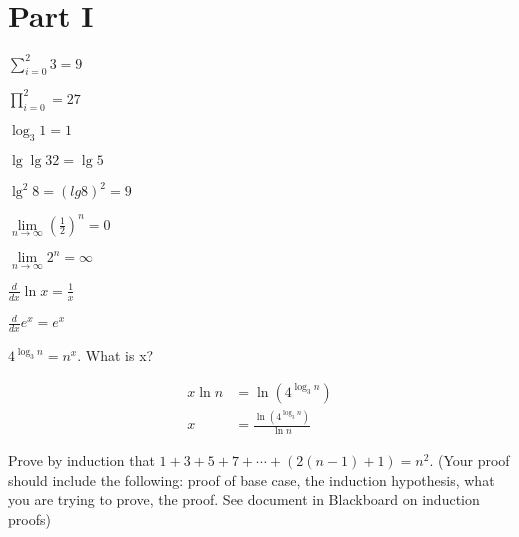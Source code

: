 \documentclass[10pt,letterpaper]{amspset}
\theoremstyle{definition}
\theoremstyle{remark}
\numberwithin{subcase}{case}
\numberwithin{equation}{section}
\begin{document}
\problemlist{}

\section{Part I}

\begin{problem}[1]
$\sum^2_{i=0} 3 = 9$
\end{problem}

\begin{problem}[2]
$\prod\limits_{i=0}^{2} = 27$
\end{problem}

\begin{problem}[3]
$\log_3 1 = 1$
\end{problem}

\begin{problem}[4]
$\lg\lg 32 = \lg5$
\end{problem}

\begin{problem}[5]
$\lg^2 8 = (lg 8)^2 = 9$
\end{problem}

\begin{problem}[6]
$\lim\limits_{n\to\infty} (\frac{1}{2})^n = 0$
\end{problem}

\begin{problem}[7]
$\lim\limits_{n\to\infty} 2^n = \infty$
\end{problem}

\begin{problem}[8]
$\frac{d}{dx}\ln x = \frac{1}{x}$
\end{problem}

\begin{problem}[9]
$\frac{d}{dx}e^x = e^x$
\end{problem}

\begin{problem}[10]
$4^{\log_3 n} = n^x$. What is x?
\end{problem}

\begin{solution}
\begin{align*}
x \ln n  &= \ln \left(4^{\log_3 n}\right) \\
x &= \frac{\ln \left(4^{\log_3 n}\right)}{\ln n} 
\end{align*}
\end{solution}

\begin{problem}[11]
Prove by induction that $1+3+5+7+\dotsb+(2(n-1)+1) = n^2$. (Your proof should include the following: proof of base case, the induction hypothesis, what you are trying to prove, the proof. See document in Blackboard on induction proofs)
\end{problem}
\end{document}
